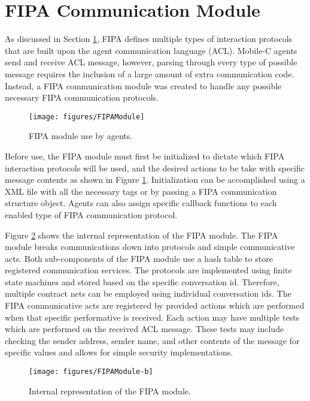   \section{FIPA Communication Module}\label{sec:fipa}
    As discussed in Section \ref{sec:fipa}, FIPA defines multiple types of
      interaction protocols that are built upon the agent communication
      language (ACL).
    Mobile-C agents send and receive ACL message, however, parsing through
      every type of possible message requires the inclusion of a large amount
      of extra communication code.
    Instead, a FIPA communication module was created to handle any possible
      necessary FIPA communication protocols.
    \begin{figure}%
    \centerline{\texttt{[image: figures/FIPAModule]}}
    \caption{FIPA module use by agents.}
    \label{fig:fipamodule}
    \end{figure}
    Before use, the FIPA module must first be initialized to dictate which 
      FIPA interaction protocols will be used, and the desired actions to be 
      take with specific message contents as shown in Figure 
      \ref{fig:fipamodule}.
    Initialization can be accomplished using a XML file with all the necessary 
      tags or by passing a FIPA communication structure object.
    Agents can also assign specific callback functions to each enabled type of
      FIPA communication protocol.

    Figure \ref{fig:fipamoduleb} shows the internal representation of the
      FIPA module.
    The FIPA module breaks communications down into protocols and simple
      communicative acts.
    Both sub-components of the FIPA module use a hash table to store 
      registered communication services.
    The protocols are implemented using finite state machines and stored based
      on the specific conversation id.
    Therefore, multiple contract nets can be employed using individual 
      conversation ids.
    The FIPA communicative acts are registered by provided actions which are
      performed when that specific performative is received.
    Each action may have multiple tests which are performed on the received 
      ACL message.
    These tests may include checking the sender address, sender name, and 
      other contents of the message for specific values and allows for
      simple security implementations.
    \begin{figure}%
    \centerline{\texttt{[image: figures/FIPAModule-b]}}
    \caption{Internal representation of the FIPA module.}
    \label{fig:fipamoduleb}
    \end{figure}

